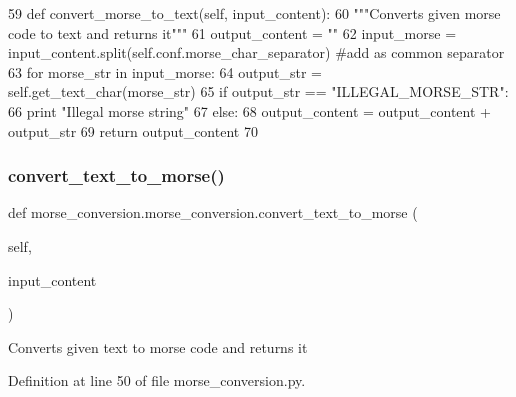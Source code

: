\begin{DoxyCode}
59     \textcolor{keyword}{def }convert\_morse\_to\_text(self, input\_content):
60         \textcolor{stringliteral}{"""Converts given morse code to text and returns it"""}
61         output\_content = \textcolor{stringliteral}{""}
62         input\_morse = input\_content.split(self.conf.morse\_char\_separator) \textcolor{comment}{#add as common separator}
63         \textcolor{keywordflow}{for} morse\_str \textcolor{keywordflow}{in} input\_morse:
64             output\_str = self.get\_text\_char(morse\_str)
65             \textcolor{keywordflow}{if} output\_str == \textcolor{stringliteral}{"ILLEGAL\_MORSE\_STR"}:
66                 \textcolor{keywordflow}{print} \textcolor{stringliteral}{"Illegal morse string"}
67             \textcolor{keywordflow}{else}:
68                 output\_content = output\_content + output\_str
69         \textcolor{keywordflow}{return} output\_content
70 \end{DoxyCode}
\mbox{\label{classmorse__conversion_1_1morse__conversion_a9c761654a08464e7308dc721adb946fb}} 
\subsubsection{\texorpdfstring{convert\+\_\+text\+\_\+to\+\_\+morse()}{convert\_text\_to\_morse()}}
{\footnotesize\ttfamily def morse\+\_\+conversion.\+morse\+\_\+conversion.\+convert\+\_\+text\+\_\+to\+\_\+morse (\begin{DoxyParamCaption}\item[{}]{self,  }\item[{}]{input\+\_\+content }\end{DoxyParamCaption})}

\begin{DoxyVerb}Converts given text to morse code and returns it\end{DoxyVerb}
 

Definition at line 50 of file morse\+\_\+conversion.\+py.


